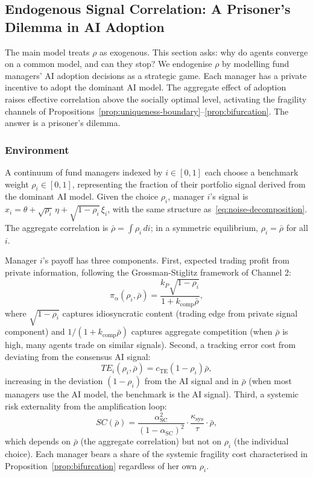 \label{sec:extensions}

\subsection{Endogenous Signal Correlation: A Prisoner's Dilemma in AI Adoption}

The main model treats $\rho$ as exogenous. This section asks: why do agents converge on a common model, and can they stop? We endogenise $\rho$ by modelling fund managers' AI adoption decisions as a strategic game. Each manager has a private incentive to adopt the dominant AI model. The aggregate effect of adoption raises effective correlation above the socially optimal level, activating the fragility channels of Propositions~\ref{prop:uniqueness-boundary}--\ref{prop:bifurcation}. The answer is a prisoner's dilemma.

\subsubsection{Environment}

A continuum of fund managers indexed by $i \in [0,1]$ each choose a benchmark weight $\rho_i \in [0,1]$, representing the fraction of their portfolio signal derived from the dominant AI model. Given the choice $\rho_i$, manager $i$'s signal is $x_i = \theta + \sqrt{\rho_i}\,\eta + \sqrt{1-\rho_i}\,\xi_i$, with the same structure as~\eqref{eq:noise-decomposition}. The aggregate correlation is $\bar{\rho} = \int \rho_i \, di$; in a symmetric equilibrium, $\rho_i = \bar{\rho}$ for all $i$.

Manager $i$'s payoff has three components. First, expected trading profit from private information, following the Grossman-Stiglitz framework of Channel 2:
\begin{equation}\label{eq:pi-alpha-adoption}
  \pi_\alpha(\rho_i, \bar{\rho}) = \frac{k_P \sqrt{1-\rho_i}}{1+k_{\text{comp}} \bar{\rho}},
\end{equation}
where $\sqrt{1-\rho_i}$ captures idiosyncratic content (trading edge from private signal component) and $1/(1+k_{\text{comp}} \bar{\rho})$ captures aggregate competition (when $\bar{\rho}$ is high, many agents trade on similar signals). Second, a tracking error cost from deviating from the consensus AI signal:
\begin{equation}\label{eq:tracking-error}
  TE_i(\rho_i, \bar{\rho}) = c_{\text{TE}} (1-\rho_i) \bar{\rho},
\end{equation}
increasing in the deviation $(1-\rho_i)$ from the AI signal and in $\bar{\rho}$ (when most managers use the AI model, the benchmark is the AI signal). Third, a systemic risk externality from the amplification loop:
\begin{equation}\label{eq:systemic-cost}
  SC(\bar{\rho}) = \frac{\alpha_{\text{SC}}^2}{(1-\alpha_{\text{SC}})^2} \cdot \frac{\kappa_{\text{sys}}}{\tau} \cdot \bar{\rho},
\end{equation}
which depends on $\bar{\rho}$ (the aggregate correlation) but not on $\rho_i$ (the individual choice). Each manager bears a share of the systemic fragility cost characterised in Proposition~\ref{prop:bifurcation} regardless of her own $\rho_i$.

